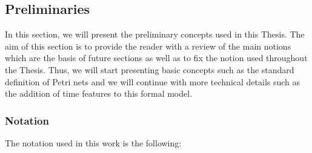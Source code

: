 \subsection*{Preliminaries}
In this section, we will present the preliminary concepts
used in this Thesis. The aim of this section is to provide the reader
with a review of the main notions which are the basis of future sections
as well as to fix the notion used throughout the Thesis.
Thus, we will start presenting basic concepts such as the standard definition of Petri
nets and we will continue with more technical details such as the addition of time features
to this formal model.


\subsubsection{Notation}
The notation used in this work is the following:

